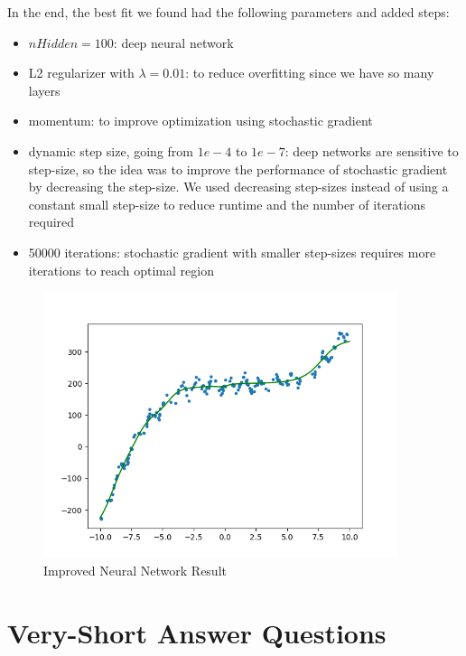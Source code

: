 \documentclass{article}
\def\items#1{\begin{itemize}#1\end{itemize}}
\begin{document}
In the end, the best fit we found had the following parameters and added steps:
\items{
    \item $nHidden = 100$: deep neural network
    \item L2 regularizer with $\lambda = 0.01$: to reduce overfitting since we have so many layers
    \item momentum: to improve optimization using stochastic gradient
    \item dynamic step size, going from $1e-4$ to $1e-7$: deep networks are sensitive to step-size, so the idea was to improve the performance of stochastic gradient by decreasing the step-size. We used decreasing step-sizes instead of using a constant small step-size to reduce runtime and the number of iterations required
    \item 50000 iterations: stochastic gradient with smaller step-sizes requires more iterations to reach optimal region
}

\begin{figure}[h!]
    \includegraphics[width=28em]{a5_q3.png}
    \caption{Improved Neural Network Result}
    \label{fig:q3}
\end{figure}

\section{Very-Short Answer Questions}
\end{document}
